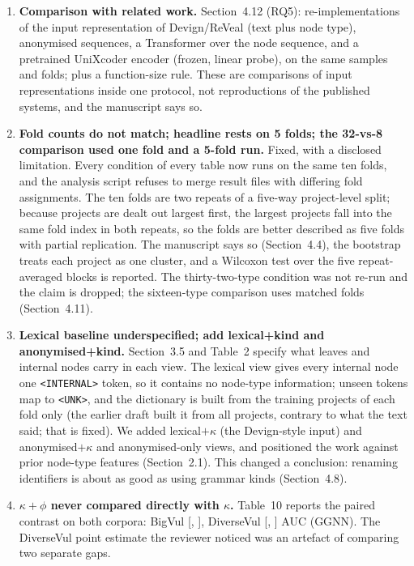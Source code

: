 \documentclass[11pt]{article}
\newcommand{\sect}[1]{Section~#1}
\begin{document}
\begin{enumerate}[leftmargin=*, label=\textbf{\arabic*.}]
\item \textbf{Comparison with related work.}
\sect{4.12} (RQ5): re-implementations of the input representation of
Devign/ReVeal (text plus node type), anonymised sequences, a Transformer over
the node sequence, and a pretrained UniXcoder encoder (frozen, linear probe), on
the same samples and folds; plus a function-size rule. These are comparisons of
input representations inside one protocol, not reproductions of the published
systems, and the manuscript says so.

\item \textbf{Fold counts do not match; headline rests on 5 folds; the 32-vs-8
comparison used one fold and a 5-fold run.}
Fixed, with a disclosed limitation. Every condition of every table now runs on
the same ten folds, and the analysis script refuses to merge result files with
differing fold assignments. The ten folds are two repeats of a five-way
project-level split; because projects are dealt out largest first, the largest
projects fall into the same fold index in both repeats, so the folds are better
described as five folds with partial replication. The manuscript says so (\sect{4.4}),
the bootstrap treats each project as one cluster, and a Wilcoxon test over the
five repeat-averaged blocks is reported.
The thirty-two-type condition was not re-run and the claim is dropped; the
sixteen-type comparison uses \numgranTOneSixFolds{} matched folds
(\sect{4.11}).

\item \textbf{Lexical baseline underspecified; add lexical+kind and
anonymised+kind.}
\sect{3.5} and Table~2 specify what leaves and internal nodes carry in each
view. The lexical view gives every internal node one \texttt{<INTERNAL>} token,
so it contains no node-type information; unseen tokens map to \texttt{<UNK>},
and the dictionary is built from the training projects of each fold only (the
earlier draft built it from all projects, contrary to what the text said; that
is fixed). We added lexical$+\kappa$ (the Devign-style input) and
anonymised$+\kappa$ and anonymised-only views, and positioned the work against
prior node-type features (\sect{2.1}). This changed a conclusion: renaming
identifiers is about as good as using grammar kinds (\sect{4.8}).

\item \textbf{$\kappa{+}\phi$ never compared directly with $\kappa$.}
Table~10 reports the paired contrast on both corpora:
BigVul \cBvGgnnOpKindVKindD{} [\cBvGgnnOpKindVKindLo{}, \cBvGgnnOpKindVKindHi{}],
DiverseVul \cDvGgnnOpKindVKindD{} [\cDvGgnnOpKindVKindLo{},
\cDvGgnnOpKindVKindHi{}] AUC (GGNN). The DiverseVul point estimate the reviewer
noticed was an artefact of comparing two separate gaps.


\end{enumerate}
\end{document}
